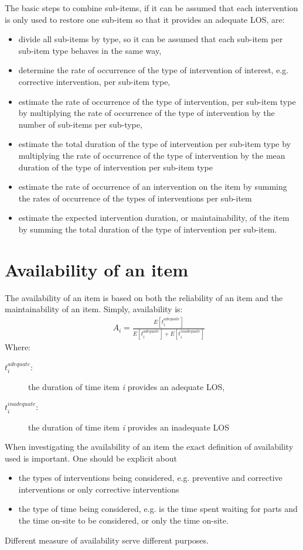 The basic steps to combine sub-items, if it can be assumed that each
intervention is only used to restore one sub-item so that it provides an adequate
LOS, are:
\begin{itemize}
	\item divide all sub-items by type, so it can be assumed that each sub-item per
sub-item type behaves in the same way,
	\item determine the rate of occurrence of the type of intervention of interest, e.g.
corrective intervention, per sub-item type,
	\item estimate the rate of occurrence of the type of intervention, per sub-item type
by multiplying the rate of occurrence of the type of intervention by the number
of sub-items per sub-type,
	\item estimate the total duration of the type of intervention per sub-item type by
multiplying the rate of occurrence of the type of intervention by the mean
duration of the type of intervention per sub-item type
	\item estimate the rate of occurrence of an intervention on the item by summing the
rates of occurrence of the types of interventions per sub-item
	\item estimate the expected intervention duration, or maintainability, of the item by
summing the total duration of the type of intervention per sub-item.
\end{itemize}
\section{Availability of an item}
The availability of an item is based on both the reliability of an item and the
maintainability of an item. Simply, availability is:
\begin{eqnarray}
&& {A_i} = \frac{{E\left[ {t_i^{adequate}} \right]}}{{E\left[ {t_i^{adequate}}
\right] + E\left[ {t_i^{inadequate}} \right]}}
\label{avaimaineq:1}
\end{eqnarray}
Where:
\begin{adjustwidth}{1cm}{}
\begin{description}
\item[$t_i^{adequate}$:] the duration of time item \textit{i} provides an adequate LOS,
\item[$t_i^{inadequate}$:] the duration of time item \textit{i} provides an inadequate LOS
\end{description}
\end{adjustwidth}
When investigating the availability of an item the exact definition of
availability used is important. One should be explicit about
\begin{itemize}
	\item the types of interventions being considered, e.g. preventive and corrective
interventions or only corrective interventions
	\item the type of time being considered, e.g. is the time spent waiting for parts and
the time on-site to be considered, or only the time on-site.
\end{itemize}
Different measure of availability serve different purposes.

